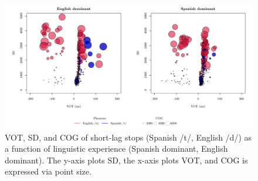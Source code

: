 \documentclass[11pt]{article}
\begin{document}
\begin{figure}[!h]
	\centering
	\includegraphics[width=.65\textwidth]{figures/dt_compare.pdf}
	\caption{VOT, SD, and COG of short-lag stops (Spanish /t/, English /d/) as a function of linguistic experience (Spanish dominant, English dominant). The y-axis plots SD, the x-axis plots VOT, and COG is expressed via point size.}
	\label{fig:2}
\end{figure}
\end{document}

